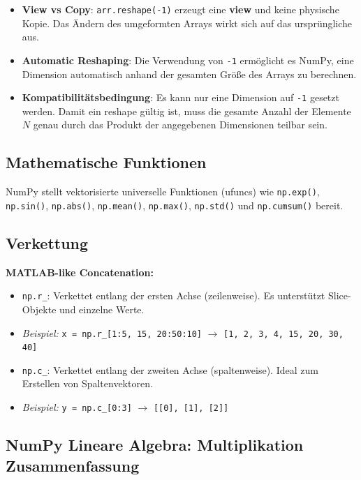 \begin{itemize}
    \item \textbf{View vs Copy}: \texttt{arr.reshape(-1)} erzeugt eine \textbf{view} und keine physische Kopie. Das Ändern des umgeformten Arrays wirkt sich auf das ursprüngliche aus.
    \item \textbf{Automatic Reshaping}: Die Verwendung von \texttt{-1} ermöglicht es NumPy,
    eine Dimension automatisch anhand der gesamten Größe des Arrays zu berechnen.
    \item \textbf{Kompatibilitätsbedingung}: Es kann nur eine Dimension auf \texttt{-1} gesetzt werden.
    Damit ein reshape gültig ist, muss die gesamte Anzahl der Elemente $N$ 
    genau durch das Produkt der angegebenen Dimensionen teilbar sein.
\end{itemize}


\subsection{Mathematische Funktionen}
NumPy stellt vektorisierte universelle Funktionen (ufuncs) wie \texttt{np.exp()}, \texttt{np.sin()}, \texttt{np.abs()}, \texttt{np.mean()}, \texttt{np.max()}, \texttt{np.std()} und \texttt{np.cumsum()} bereit.

\subsection{Verkettung}
\textbf{MATLAB-like Concatenation:}

\begin{itemize}
    \item \texttt{np.r\_}: Verkettet entlang der ersten Achse (zeilenweise). Es unterstützt Slice-Objekte und einzelne Werte.
    \item \textit{Beispiel:} \texttt{x = np.r\_[1:5, 15, 20:50:10]} $\rightarrow$ \texttt{[1, 2, 3, 4, 15, 20, 30, 40]}
    \item \texttt{np.c\_}: Verkettet entlang der zweiten Achse (spaltenweise). Ideal zum Erstellen von Spaltenvektoren.
    \item \textit{Beispiel:} \texttt{y = np.c\_[0:3]} $\rightarrow$ \texttt{[[0], [1], [2]]}
\end{itemize}

\subsection{NumPy Lineare Algebra: Multiplikation Zusammenfassung}


